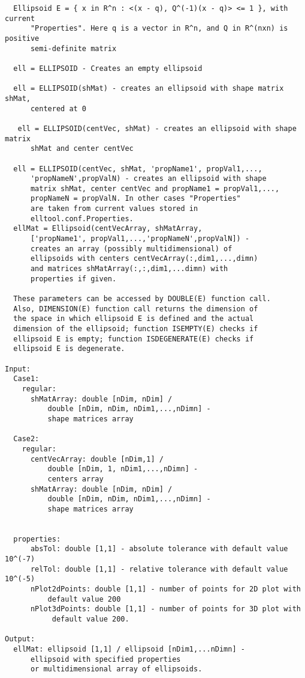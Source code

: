 \begin{enumerate}
\begin{lstlisting}
  Ellipsoid E = { x in R^n : <(x - q), Q^(-1)(x - q)> <= 1 }, with current
      "Properties". Here q is a vector in R^n, and Q in R^(nxn) is positive
      semi-definite matrix

  ell = ELLIPSOID - Creates an empty ellipsoid

  ell = ELLIPSOID(shMat) - creates an ellipsoid with shape matrix shMat,
      centered at 0

   ell = ELLIPSOID(centVec, shMat) - creates an ellipsoid with shape matrix
      shMat and center centVec

  ell = ELLIPSOID(centVec, shMat, 'propName1', propVal1,...,
      'propNameN',propValN) - creates an ellipsoid with shape
      matrix shMat, center centVec and propName1 = propVal1,...,
      propNameN = propValN. In other cases "Properties"
      are taken from current values stored in
      elltool.conf.Properties.
  ellMat = Ellipsoid(centVecArray, shMatArray,
      ['propName1', propVal1,...,'propNameN',propValN]) -
      creates an array (possibly multidimensional) of
      ellipsoids with centers centVecArray(:,dim1,...,dimn)
      and matrices shMatArray(:,:,dim1,...dimn) with
      properties if given.

  These parameters can be accessed by DOUBLE(E) function call.
  Also, DIMENSION(E) function call returns the dimension of
  the space in which ellipsoid E is defined and the actual
  dimension of the ellipsoid; function ISEMPTY(E) checks if
  ellipsoid E is empty; function ISDEGENERATE(E) checks if
  ellipsoid E is degenerate.

Input:
  Case1:
    regular:
      shMatArray: double [nDim, nDim] /
          double [nDim, nDim, nDim1,...,nDimn] -
          shape matrices array

  Case2:
    regular:
      centVecArray: double [nDim,1] /
          double [nDim, 1, nDim1,...,nDimn] -
          centers array
      shMatArray: double [nDim, nDim] /
          double [nDim, nDim, nDim1,...,nDimn] -
          shape matrices array


  properties:
      absTol: double [1,1] - absolute tolerance with default value 10^(-7)
      relTol: double [1,1] - relative tolerance with default value 10^(-5)
      nPlot2dPoints: double [1,1] - number of points for 2D plot with
          default value 200
      nPlot3dPoints: double [1,1] - number of points for 3D plot with
           default value 200.

Output:
  ellMat: ellipsoid [1,1] / ellipsoid [nDim1,...nDimn] -
      ellipsoid with specified properties
      or multidimensional array of ellipsoids.


\end{lstlisting}
\end{enumerate}
